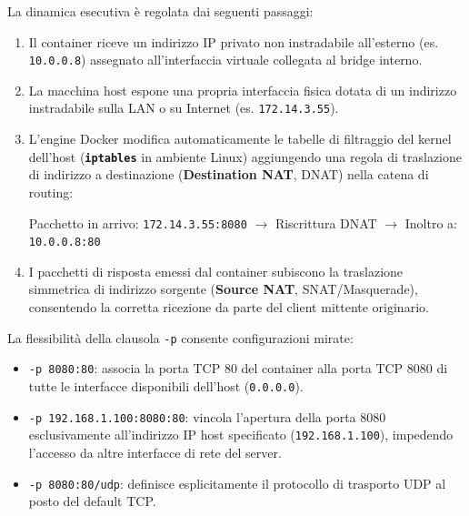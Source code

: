 \documentclass[11pt, a4paper]{article}
\begin{document}
La dinamica esecutiva è regolata dai seguenti passaggi:
\begin{enumerate}
    \item Il container riceve un indirizzo IP privato non instradabile all'esterno (es. \texttt{10.0.0.8}) assegnato all'interfaccia virtuale collegata al bridge interno.
    \item La macchina host espone una propria interfaccia fisica dotata di un indirizzo instradabile sulla LAN o su Internet (es. \texttt{172.14.3.55}).
    \item L'engine Docker modifica automaticamente le tabelle di filtraggio del kernel dell'host (\textbf{\texttt{iptables}} in ambiente Linux) aggiungendo una regola di traslazione di indirizzo a destinazione (\textbf{Destination NAT}, DNAT) nella catena di routing:
\begin{center}
    Pacchetto in arrivo: \texttt{172.14.3.55:8080} $\longrightarrow$ Riscrittura DNAT $\longrightarrow$ Inoltro a: \texttt{10.0.0.8:80}
\end{center}
    \item I pacchetti di risposta emessi dal container subiscono la traslazione simmetrica di indirizzo sorgente (\textbf{Source NAT}, SNAT/Masquerade), consentendo la corretta ricezione da parte del client mittente originario.
\end{enumerate}

La flessibilità della clausola \texttt{-p} consente configurazioni mirate:
\begin{itemize}
    \item \texttt{-p 8080:80}: associa la porta TCP 80 del container alla porta TCP 8080 di tutte le interfacce disponibili dell'host (\texttt{0.0.0.0}).
    \item \texttt{-p 192.168.1.100:8080:80}: vincola l'apertura della porta 8080 esclusivamente all'indirizzo IP host specificato (\texttt{192.168.1.100}), impedendo l'accesso da altre interfacce di rete del server.
    \item \texttt{-p 8080:80/udp}: definisce esplicitamente il protocollo di trasporto UDP al posto del default TCP.
\end{itemize}

\newpage

\end{document}
